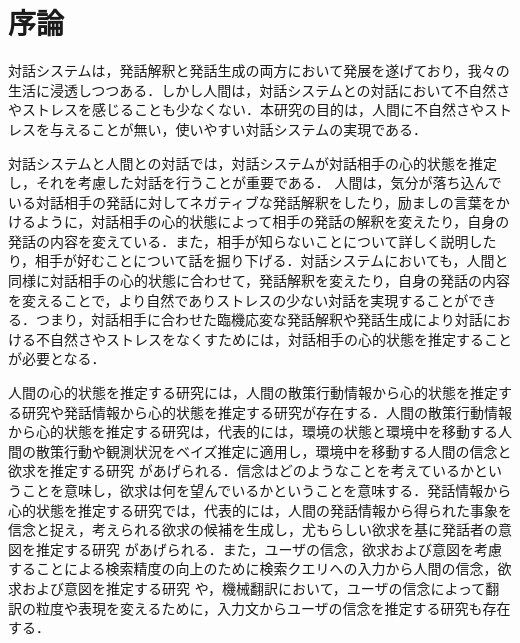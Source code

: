 \chapter{序論}

\par
対話システムは，発話解釈と発話生成の両方において発展を遂げており，我々の生活に浸透しつつある．しかし人間は，対話システムとの対話において不自然さやストレスを感じることも少なくない．本研究の目的は，人間に不自然さやストレスを与えることが無い，使いやすい対話システムの実現である．

\par
対話システムと人間との対話では，対話システムが対話相手の心的状態を推定し，それを考慮した対話を行うことが重要である．
人間は，気分が落ち込んでいる対話相手の発話に対してネガティブな発話解釈をしたり，励ましの言葉をかけるように，対話相手の心的状態によって相手の発話の解釈を変えたり，自身の発話の内容を変えている．また，相手が知らないことについて詳しく説明したり，相手が好むことについて話を掘り下げる．対話システムにおいても，人間と同様に対話相手の心的状態に合わせて，発話解釈を変えたり，自身の発話の内容を変えることで，より自然でありストレスの少ない対話を実現することができる．つまり，対話相手に合わせた臨機応変な発話解釈や発話生成により対話における不自然さやストレスをなくすためには，対話相手の心的状態を推定することが必要となる．


\par
人間の心的状態を推定する研究には，人間の散策行動情報から心的状態を推定する研究や発話情報から心的状態を推定する研究が存在する．人間の散策行動情報から心的状態を推定する研究は，代表的には，環境の状態と環境中を移動する人間の散策行動や観測状況をベイズ推定\cite{alma9926464316904034}に適用し，環境中を移動する人間の信念と欲求を推定する研究 \cite{baker2011bayesian}があげられる．信念はどのようなことを考えているかということを意味し，欲求は何を望んでいるかということを意味する．発話情報から心的状態を推定する研究では，代表的には，人間の発話情報から得られた事象を信念と捉え，考えられる欲求の候補を生成し，尤もらしい欲求を基に発話者の意図を推定する研究 \cite{高橋拓誠2015bdi}があげられる．また，ユーザの信念，欲求および意図を考慮することによる検索精度の向上のために検索クエリへの入力から人間の信念，欲求および意図を推定する研究 \cite{10.1007/978-3-642-02481-8_4}や，機械翻訳において，ユーザの信念によって翻訳の粒度や表現を変えるために，入力文からユーザの信念を推定する研究\cite{farwell1997user}も存在する．


